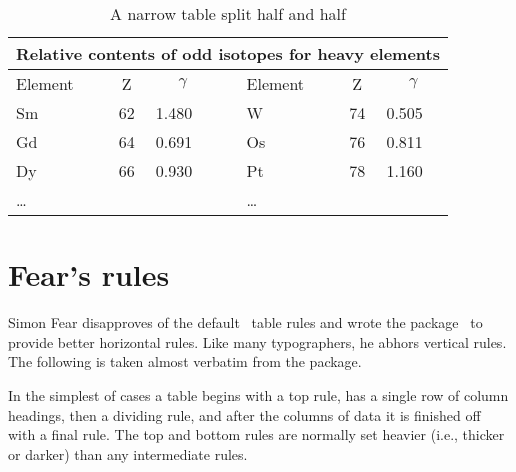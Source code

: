 \settowidth{\versewidth}{Relative contents of odd isotopes for heavy elements}
\addtolength{\versewidth}{2mm}
\begin{table}
\begin{adjustwidth}{-5mm}{-5mm}
\centering \addtolength{\cmidrulekern}{0.25em}
\caption{A narrow table split half and half} \label{tab:halfhalf}
\begin{tabularx}{\versewidth}{lclXlcl@{}} 
\multicolumn{7}{c}{Relative contents of odd isotopes for heavy elements}\\ \toprule
Element & Z & \multicolumn{1}{c}{$\gamma$} & & 
Element & Z & \multicolumn{1}{c}{$\gamma$} \\ \cmidrule{1-3}\cmidrule(r){5-7}
Sm & 62 & 1.480 & & W  & 74 & 0.505 \\
Gd & 64 & 0.691 & & Os & 76 & 0.811 \\
Dy & 66 & 0.930 & & Pt & 78 & 1.160 \\
\ldots & &      & & \ldots & &      \\ \bottomrule
\end{tabularx}
\end{adjustwidth}
\end{table}

\section{Fear's rules}

    Simon Fear disapproves of the default \ltx\ table 
rules and
wrote the  package~\cite{BOOKTABS} to provide
better horizontal rules. Like many typographers, he abhors vertical rules.
The following is taken almost verbatim from the  package.


 In the simplest of cases a table begins with a top rule, has
 a single row of column headings, then a dividing rule, 
and after the columns of data it is finished
off with a final rule. The top and bottom rules are normally
set heavier (i.e., thicker or darker) than any intermediate rules.


